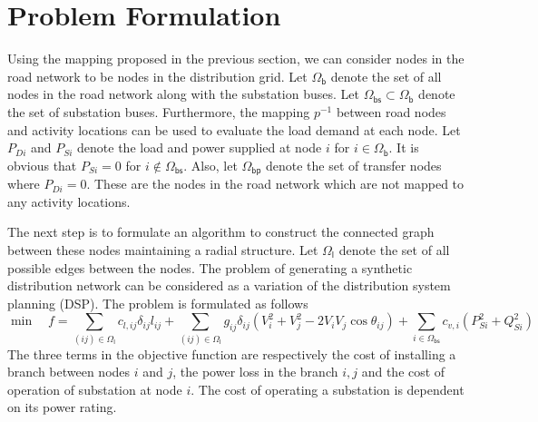 \section{Problem Formulation}
Using the mapping proposed in the previous section, we can consider nodes in the road network to be nodes in the distribution grid. Let $\mathsf{\Omega_b}$ denote the set of all nodes in the road network along with the substation buses. Let $\mathsf{\Omega_{bs}}\subset\mathsf{\Omega_b}$ denote the set of substation buses. Furthermore, the mapping $p^{-1}$ between road nodes and activity locations can be used to evaluate the load demand at each node. Let $P_{Di}$ and $P_{Si}$ denote the load and power supplied at node $i$ for $i\in\mathsf{\Omega_b}$. It is obvious that $P_{Si}=0$ for $i\notin\mathsf{\Omega_{bs}}$. Also, let $\mathsf{\Omega_{bp}}$ denote the set of transfer nodes where $P_{Di}=0$. These are the nodes in the road network which are not mapped to any activity locations.

The next step is to formulate an algorithm to construct the connected graph between these nodes maintaining a radial structure. Let $\mathsf{\Omega_l}$ denote the set of all possible edges between the nodes. The problem of generating a synthetic distribution network can be considered as a variation of the distribution system planning (DSP). The problem is formulated as follows
\begin{equation}
\min\quad f=\sum_{(ij)\in\mathsf{\Omega_l}}{c_{l,ij}\delta_{ij}l_{ij}}+\sum_{(ij)\in\mathsf{\Omega_l}}{g_{ij}\delta_{ij}(V_i^2+V_j^2-2V_iV_j\cos\theta_{ij})}+\sum_{i\in\mathsf{\Omega_{bs}}}{c_{v,i}(P_{Si}^2+Q_{Si}^2)}\label{eq:obj}
\end{equation}
The three terms in the objective function are respectively the cost of installing a branch between nodes $i$ and $j$, the power loss in the branch $i,j$ and the cost of operation of substation at node $i$. The cost of operating a substation is dependent on its power rating. 

